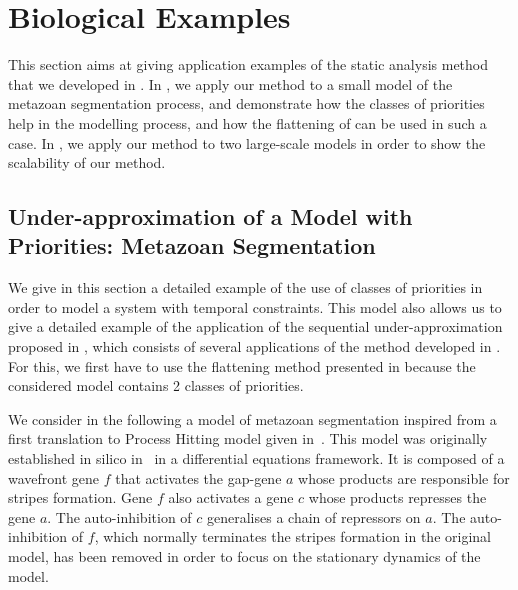 
\section{Biological Examples}\label{sec:example}

This section aims at giving application examples of the static analysis method
that we developed in .
In , we apply our method to a small model of the
metazoan segmentation process,
and demonstrate how the classes of priorities help in the modelling process,
and how the flattening of 
can be used in such a case.
In , we apply our method to two large-scale models
in order to show the scalability of our method.



\subsection{Under-approximation of a Model with Priorities: Metazoan Segmentation}
\label{ssec:ex-metazoan}

We give in this section a detailed example of the use of classes of priorities
in order to model a system with temporal constraints.
This model also allows us to give a detailed example of the application of the sequential
under-approximation proposed in ,
which consists of several applications of the method developed in
.
For this, we first have to use the flattening method presented in 
because the considered model contains 2 classes of priorities.

We consider in the following a model of metazoan segmentation
inspired from a first translation to Process Hitting model given in~\cite{PMR10-TCSB}.
This model was originally established in silico in~\cite{MSB:MSB4100192}
in a differential equations framework.
It is composed of a wavefront gene $f$ that activates the gap-gene $a$ whose products are responsible for stripes formation.
Gene $f$ also activates a gene $c$ whose products represses the gene $a$.
The auto-inhibition of $c$ generalises a chain of repressors on $a$.
The auto-inhibition of $f$, which normally terminates
the stripes formation in the original model,
has been removed in order to focus on the stationary dynamics of the model.

